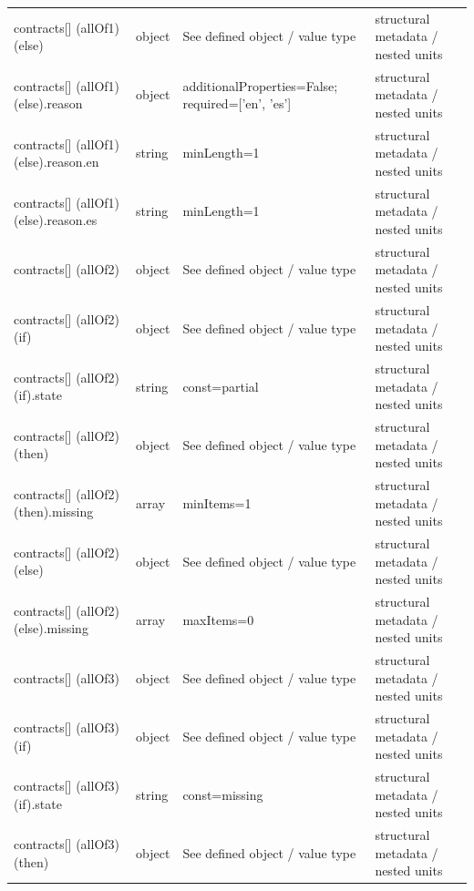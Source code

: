 \begin{longtable}{@{}>{\raggedright\arraybackslash}p{}>{\raggedright\arraybackslash}p{}>{\raggedright\arraybackslash}p{}>{\raggedright\arraybackslash}p{}@{}}
contracts[] (allOf1) (else) & object & See defined object /\allowbreak{} value type & structural metadata /\allowbreak{} nested units\\
contracts[] (allOf1) (else).\allowbreak{}reason & object & additionalProperties=\allowbreak{}False; required=\allowbreak{}['en', 'es'] & structural metadata /\allowbreak{} nested units\\
contracts[] (allOf1) (else).\allowbreak{}reason.\allowbreak{}en & string & minLength=\allowbreak{}1 & structural metadata /\allowbreak{} nested units\\
contracts[] (allOf1) (else).\allowbreak{}reason.\allowbreak{}es & string & minLength=\allowbreak{}1 & structural metadata /\allowbreak{} nested units\\
contracts[] (allOf2) & object & See defined object /\allowbreak{} value type & structural metadata /\allowbreak{} nested units\\
contracts[] (allOf2) (if) & object & See defined object /\allowbreak{} value type & structural metadata /\allowbreak{} nested units\\
contracts[] (allOf2) (if).\allowbreak{}state & string & const=\allowbreak{}partial & structural metadata /\allowbreak{} nested units\\
contracts[] (allOf2) (then) & object & See defined object /\allowbreak{} value type & structural metadata /\allowbreak{} nested units\\
contracts[] (allOf2) (then).\allowbreak{}missing & array & minItems=\allowbreak{}1 & structural metadata /\allowbreak{} nested units\\
contracts[] (allOf2) (else) & object & See defined object /\allowbreak{} value type & structural metadata /\allowbreak{} nested units\\
contracts[] (allOf2) (else).\allowbreak{}missing & array & maxItems=\allowbreak{}0 & structural metadata /\allowbreak{} nested units\\
contracts[] (allOf3) & object & See defined object /\allowbreak{} value type & structural metadata /\allowbreak{} nested units\\
contracts[] (allOf3) (if) & object & See defined object /\allowbreak{} value type & structural metadata /\allowbreak{} nested units\\
contracts[] (allOf3) (if).\allowbreak{}state & string & const=\allowbreak{}missing & structural metadata /\allowbreak{} nested units\\
contracts[] (allOf3) (then) & object & See defined object /\allowbreak{} value type & structural metadata /\allowbreak{} nested units\\

\end{longtable}
